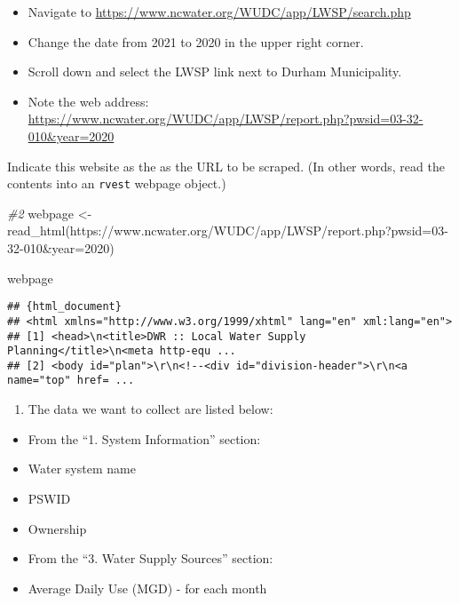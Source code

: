 \documentclass[
]{article}
\newenvironment{Shaded}{\begin{snugshade}}{\end{snugshade}}
\newcommand{\CommentTok}[1]{\textcolor[rgb]{0.56,0.35,0.01}{\textit{#1}}}
\newcommand{\FunctionTok}[1]{\textcolor[rgb]{0.00,0.00,0.00}{#1}}
\newcommand{\NormalTok}[1]{#1}
\newcommand{\OtherTok}[1]{\textcolor[rgb]{0.56,0.35,0.01}{#1}}
\newcommand{\StringTok}[1]{\textcolor[rgb]{0.31,0.60,0.02}{#1}}
\providecommand{\tightlist}{%
  \setlength{\itemsep}{0pt}\setlength{\parskip}{0pt}}
\begin{document}
\begin{itemize}
\tightlist
\item
  Navigate to \url{https://www.ncwater.org/WUDC/app/LWSP/search.php}
\item
  Change the date from 2021 to 2020 in the upper right corner.
\item
  Scroll down and select the LWSP link next to Durham Municipality.
\item
  Note the web address:
  \url{https://www.ncwater.org/WUDC/app/LWSP/report.php?pwsid=03-32-010\&year=2020}
\end{itemize}

Indicate this website as the as the URL to be scraped. (In other words,
read the contents into an \texttt{rvest} webpage object.)

\begin{Shaded}
\begin{Highlighting}[]
\CommentTok{\#2}
\NormalTok{webpage }\OtherTok{\textless{}{-}} \FunctionTok{read\_html}\NormalTok{(}\StringTok{\textquotesingle{}https://www.ncwater.org/WUDC/app/LWSP/report.php?pwsid=03{-}32{-}010\&year=2020\textquotesingle{}}\NormalTok{)}

\NormalTok{webpage}
\end{Highlighting}
\end{Shaded}

\begin{verbatim}
## {html_document}
## <html xmlns="http://www.w3.org/1999/xhtml" lang="en" xml:lang="en">
## [1] <head>\n<title>DWR :: Local Water Supply Planning</title>\n<meta http-equ ...
## [2] <body id="plan">\r\n<!--<div id="division-header">\r\n<a name="top" href= ...
\end{verbatim}

\begin{enumerate}
\def\labelenumi{\arabic{enumi}.}
\setcounter{enumi}{2}
\tightlist
\item
  The data we want to collect are listed below:
\end{enumerate}

\begin{itemize}
\item
  From the ``1. System Information'' section:
\item
  Water system name
\item
  PSWID
\item
  Ownership
\item
  From the ``3. Water Supply Sources'' section:
\item
  Average Daily Use (MGD) - for each month
\end{itemize}
\end{document}
